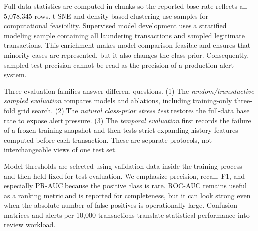 \documentclass{article}
\begin{document}
Full-data statistics are computed in chunks so the reported base rate reflects all 5,078,345 rows. t-SNE and density-based clustering use samples for computational feasibility. Supervised model development uses a stratified modeling sample containing all laundering transactions and sampled legitimate transactions. This enrichment makes model comparison feasible and ensures that minority cases are represented, but it also changes the class prior. Consequently, sampled-test precision cannot be read as the precision of a production alert system.

Three evaluation families answer different questions. (1) The \emph{random/transductive sampled evaluation} compares models and ablations, including training-only three-fold grid search. (2) The \emph{natural class-prior stress test} restores the full-data base rate to expose alert pressure. (3) The \emph{temporal evaluation} first records the failure of a frozen training snapshot and then tests strict expanding-history features computed before each transaction. These are separate protocols, not interchangeable views of one test set.

\begin{table}[H]
\centering
\caption{Interpretation boundary for the three evaluation protocols.}
\end{table}

Model thresholds are selected using validation data inside the training process and then held fixed for test evaluation. We emphasize precision, recall, F1, and especially PR-AUC because the positive class is rare. ROC-AUC remains useful as a ranking metric and is reported for completeness, but it can look strong even when the absolute number of false positives is operationally large. Confusion matrices and alerts per 10,000 transactions translate statistical performance into review workload.
\end{document}
